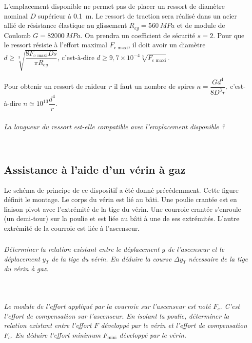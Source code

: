 \begin{multicols}{2}
L’emplacement disponible ne permet pas de placer un ressort de diamètre
nominal $D$ supérieur à \SI{0,1}{m}. Le ressort de traction sera réalisé dans un acier
allié de résistance élastique au glissement $R_{eg}=\SI{560}{MPa}$ et de module de Coulomb $G=\SI{82000}{MPa}$. On prendra un coefficient de sécurité $s=2$. Pour que le
ressort résiste à l’effort maximal $F_{\text{c maxi}}$, il doit avoir un diamètre
$d\geq \sqrt[3]{\dfrac{8 F_{\text{c maxi}} D s}{\pi R_{eg}}}$, 
c'est-à-dire $d\geq 9,7 \times 10^{-4}\sqrt[3]{F_{\text{c maxi}}}$.

Pour obtenir un ressort de raideur $r$ il faut un nombre de spires $n=\dfrac{Gd^4}{8D^3 r}$, c'est-à-dire $n\simeq 10^13\dfrac{d^4}{r}$.

\subparagraph{}\textit{La longueur du ressort est-elle compatible avec l’emplacement disponible ?}
\ifprof
\begin{corrige}~\\
\end{corrige}
\else
\fi

\subsection*{Assistance à l’aide d’un vérin à gaz}
Le schéma de principe de ce dispositif a été donné précédemment. Cette
figure définit le montage. Le corps du vérin est lié au bâti. Une poulie crantée
est en liaison pivot avec l’extrémité de la tige du vérin. Une courroie crantée
s’enroule (un demi-tour) sur la poulie et est liée au bâti à une de ses extrémités.
L’autre extrémité de la courroie est liée à l’ascenseur.

\subparagraph{}\textit{Déterminer la relation existant entre le déplacement $y$ de l’ascenseur et le
déplacement $y_T$ de la tige du vérin. En déduire la course $\Delta y_T$ nécessaire de la tige du vérin à gaz.}
\ifprof
\begin{corrige}~\\
\end{corrige}
\else
\fi


\subparagraph{}\textit{Le module de l’effort appliqué par la courroie sur l’ascenseur est noté $F_c$.
C’est l’effort de compensation sur l’ascenseur. En isolant la poulie, déterminer
la relation existant entre l’effort $F$ développé par le vérin et l’effort de compensation $F_c$. 
En déduire l’effort minimum $F_{\text{mini}}$ développé par le vérin.}

\ifprof
\begin{corrige}~\\
\end{corrige}
\else
\fi



\end{multicols}
